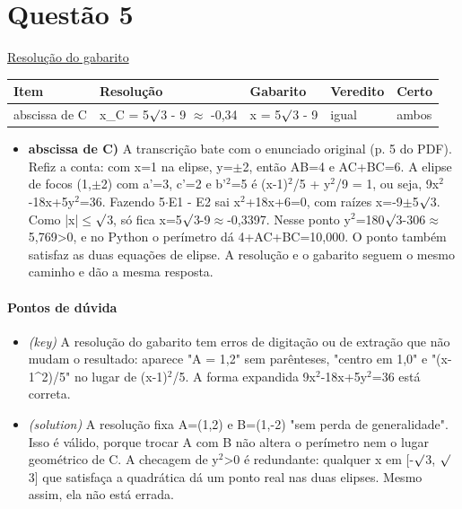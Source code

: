 \documentclass{article}%
\begin{document}
\section*{Questão 5}%
\href{https://poliedroresolve.sistemapoliedro.com.br/vestibulares/ita/2027/ita-2-fase-dia-1-20-10-2026-2-fase-dia-1/dissertativa-5-matematica-2-fase-dia-1-ita-2027}{Resolução do gabarito}\par\smallskip%
\begin{longtable}{@{}p{} p{} p{} p{} p{}@{}}\toprule Item & Resolução & Gabarito & Veredito & Certo \\ \midrule
abscissa de C & x\_C = 5$\surd$3 - 9 $\approx$ -0,34 & x = 5$\surd$3 - 9 & igual & ambos \\
\bottomrule\end{longtable}%
\begin{itemize}%
\item%
\textbf{abscissa de C)} A transcrição bate com o enunciado original (p. 5 do PDF). Refiz a conta: com x=1 na elipse, y=$\pm$2, então AB=4 e AC+BC=6. A elipse de focos (1,$\pm$2) com a'=3, c'=2 e b'$^2$=5 é (x-1)$^2$/5 + y$^2$/9 = 1, ou seja, 9x$^2$-18x+5y$^2$=36. Fazendo 5$\cdot$E1 - E2 sai x$^2$+18x+6=0, com raízes x=-9$\pm$5$\surd$3. Como |x|$\leq$$\surd$3, só fica x=5$\surd$3-9$\approx$-0,3397. Nesse ponto y$^2$=180$\surd$3-306$\approx$5,769>0, e no Python o perímetro dá 4+AC+BC=10,000. O ponto também satisfaz as duas equações de elipse. A resolução e o gabarito seguem o mesmo caminho e dão a mesma resposta.%
\end{itemize}%
\paragraph{Pontos de dúvida}%
\begin{itemize}%
\item%
\textit{(key)} A resolução do gabarito tem erros de digitação ou de extração que não mudam o resultado: aparece "A = 1,2" sem parênteses, "centro em 1,0" e "(x{-}1\^{}2)/5" no lugar de (x-1)$^2$/5. A forma expandida 9x$^2$-18x+5y$^2$=36 está correta.%
\item%
\textit{(solution)} A resolução fixa A=(1,2) e B=(1,-2) "sem perda de generalidade". Isso é válido, porque trocar A com B não altera o perímetro nem o lugar geométrico de C. A checagem de y$^2$>0 é redundante: qualquer x em {[}-$\surd$3, $\surd$3{]} que satisfaça a quadrática dá um ponto real nas duas elipses. Mesmo assim, ela não está errada.%
\end{itemize}%
\end{document}
